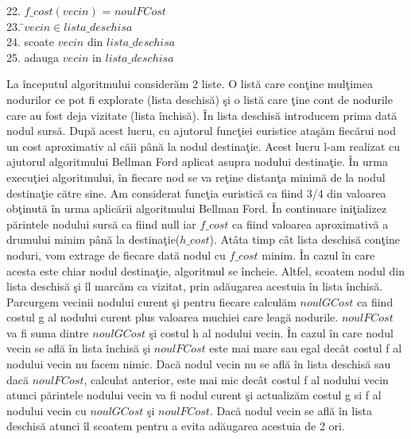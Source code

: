 \documentclass{article}
\begin{document}
\begin{tabbing}
22.                      \>                        \>                    \>$f\_cost(vecin)$ = $noulFCost$\\
23.                      \>                        \>                     \=$vecin \in lista\_deschisa$ \\
24.                      \>                        \>                    \>             \>scoate $vecin$ din $lista\_deschisa$ \\
25.                      \>                        \>                    \>adauga $vecin$ in $lista\_deschisa$ \\
\end{tabbing}

\newpage

La \^{i}nceputul algoritmului consider\u{a}m 2 liste. O list\u{a} care con\c{t}ine mul\c{t}imea nodurilor ce pot fi explorate (lista deschis\u{a}) \c{s}i o list\u{a} care \c{t}ine cont de nodurile care au fost deja vizitate (lista \^{i}nchis\u{a}). \^{I}n lista deschis\u{a} introducem prima dat\u{a} nodul surs\u{a}. Dup\u{a} acest lucru, cu ajutorul func\c{t}iei euristice ata\c{s}\u{a}m fiec\u{a}rui nod un cost aproximativ al c\u{a}ii p\^{a}n\u{a} la nodul destina\c{t}ie. Acest lucru l-am realizat cu ajutorul algoritmului Bellman Ford aplicat asupra nodului destina\c{t}ie. \^{I}n urma execu\c{t}iei algoritmului, \^{i}n fiecare nod se va re\c{t}ine distan\c{t}a minim\u{a} de la nodul destina\c{t}ie c\u{a}tre sine. Am considerat func\c{t}ia euristic\u{a} ca fiind 3/4 din valoarea ob\c{t}inut\u{a} \^{i}n urma aplic\u{a}rii algoritmului Bellman Ford. \^{I}n continuare ini\c{t}ializez p\u{a}rintele nodului surs\u{a} ca fiind null iar $f\_cost$ ca fiind valoarea aproximativ\u{a} a drumului minim p\^{a}n\u{a} la destina\c{t}ie($h\_cost$). At\^{a}ta timp c\^{a}t lista deschis\u{a} con\c{t}ine noduri, vom extrage de fiecare dat\u{a} nodul cu $f\_cost$ minim. \^{I}n cazul \^{i}n care acesta este chiar nodul destina\c{t}ie, algoritmul se \^{i}ncheie. Altfel, scoatem nodul din lista deschis\u{a} \c{s}i \^{i}l marc\u{a}m ca vizitat, prin ad\u{a}ugarea acestuia \^{i}n lista \^{i}nchis\u{a}. Parcurgem vecinii nodului curent \c{s}i pentru fiecare calcul\u{a}m $noulGCost$ ca fiind costul g al nodului curent plus valoarea muchiei care leag\u{a} nodurile. $noulFCost$ va fi suma dintre $noulGCost$ \c{s}i costul h al nodului vecin. \^{I}n cazul \^{i}n care nodul vecin se afl\u{a} \^{i}n lista \^{i}nchis\u{a} \c{s}i $noulFCost$ este mai mare sau egal dec\^{a}t costul f al nodului vecin nu facem nimic. Dac\u{a} nodul vecin nu se afl\u{a} \^{i}n lista deschis\u{a} sau dac\u{a} $noulFCost$, calculat anterior, este mai mic dec\^{a}t costul f al nodului vecin atunci p\u{a}rintele nodului vecin va fi nodul curent \c{s}i actualiz\u{a}m costul g si f al nodului vecin cu $noulGCost$ \c{s}i $noulFCost$. Dac\u{a} nodul vecin se afl\u{a} \^{i}n lista deschis\u{a} atunci \^{i}l scoatem pentru a evita ad\u{a}ugarea acestuia de 2 ori.
 
\end{document}
